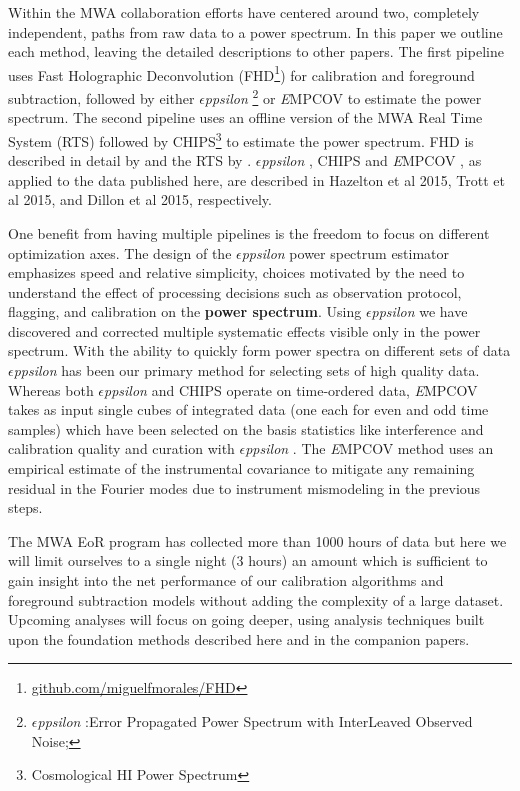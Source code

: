 \documentclass[preprint]{aastex}
\def\eppsilon{{\it $\epsilon$ppsilon }}
\def\implicitcov{{\emph EMPCOV }}
\def\chipscite{Trott et al 2015}
\def\eppsiloncite{Hazelton et al 2015}
\def\dilloncite{Dillon et al 2015}
\begin{document}
Within the MWA collaboration efforts have centered around two, completely independent, paths from raw data to a power spectrum.  In this paper we outline each method, leaving the detailed descriptions to other papers.   The first pipeline uses Fast Holographic Deconvolution (FHD\footnote{\url{github.com/miguelfmorales/FHD}}) for calibration and foreground subtraction, followed by either \eppsilon\footnote{\eppsilon:Error Propagated Power Spectrum with InterLeaved Observed Noise;} or \implicitcov to estimate the power spectrum.  The second pipeline uses an offline version of the MWA Real Time System (RTS) followed by CHIPS\footnote{Cosmological HI Power Spectrum} to estimate the power spectrum.  FHD is described in detail by \cite{Sullivan:2012p9457} and the RTS by \cite{Ord:2010p8442}. \eppsilon, CHIPS and \implicitcov, as applied to the data published here, are described in \eppsiloncite, \chipscite, and \dilloncite, respectively.

One benefit from having multiple pipelines is the freedom to focus on different optimization axes.  The design of the \eppsilon power spectrum estimator emphasizes speed and relative simplicity, choices  motivated by the need to understand the effect of processing decisions such as observation protocol, flagging, and calibration on the {\bf power spectrum}. Using \eppsilon we have discovered and corrected multiple systematic effects visible only in the power spectrum. With the ability to quickly form power spectra on different sets of data \eppsilon has been our primary method for selecting sets of high quality data. Whereas both \eppsilon and CHIPS operate on time-ordered data, \implicitcov takes as input single cubes of integrated data (one each for even and odd time samples) which have been selected on the basis statistics like interference and calibration quality and curation with \eppsilon. The \implicitcov method uses an empirical estimate of the instrumental covariance to mitigate any remaining residual in the Fourier modes due to instrument mismodeling in the previous steps. 

 The MWA EoR program has collected more than 1000 hours of data but here we will limit ourselves to a single night (3 hours) an amount which is sufficient to gain insight into the net performance of our calibration algorithms and foreground subtraction models without adding the complexity of a large dataset.  Upcoming analyses will focus on going deeper, using analysis techniques built upon the foundation methods described here and in the companion papers.
\end{document}
